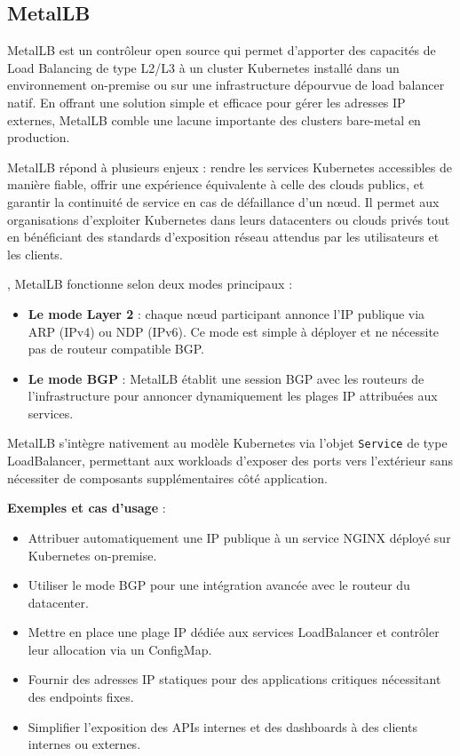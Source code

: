 \subsection{MetalLB}

MetalLB est un contrôleur open source qui permet d’apporter des capacités de Load Balancing de type L2/L3 à un cluster Kubernetes installé dans un environnement on-premise ou sur une infrastructure dépourvue de load balancer natif. En offrant une solution simple et efficace pour gérer les adresses IP externes, MetalLB comble une lacune importante des clusters bare-metal en production.

MetalLB répond à plusieurs enjeux  : rendre les services Kubernetes accessibles de manière fiable, offrir une expérience équivalente à celle des clouds publics, et garantir la continuité de service en cas de défaillance d’un nœud. Il permet aux organisations d’exploiter Kubernetes dans leurs datacenters ou clouds privés tout en bénéficiant des standards d’exposition réseau attendus par les utilisateurs et les clients.

, MetalLB fonctionne selon deux modes principaux :
\begin{itemize}
	\item \textbf{Le mode Layer 2}  : chaque nœud participant annonce l’IP publique via ARP (IPv4) ou NDP (IPv6). Ce mode est simple à déployer et ne nécessite pas de routeur compatible BGP.
	\item \textbf{Le mode BGP}  : MetalLB établit une session BGP avec les routeurs de l’infrastructure pour annoncer dynamiquement les plages IP attribuées aux services.
\end{itemize}

MetalLB s’intègre nativement au modèle Kubernetes via l’objet \texttt{Service} de type LoadBalancer, permettant aux workloads d’exposer des ports vers l’extérieur sans nécessiter de composants supplémentaires côté application.

\textbf{Exemples et cas d’usage} :
\begin{itemize}
	\item Attribuer automatiquement une IP publique à un service NGINX déployé sur Kubernetes on-premise.
	\item Utiliser le mode BGP pour une intégration avancée avec le routeur du datacenter.
	\item Mettre en place une plage IP dédiée aux services LoadBalancer et contrôler leur allocation via un ConfigMap.
	\item Fournir des adresses IP statiques pour des applications critiques nécessitant des endpoints fixes.
	\item Simplifier l’exposition des APIs internes et des dashboards à des clients internes ou externes.
\end{itemize}

